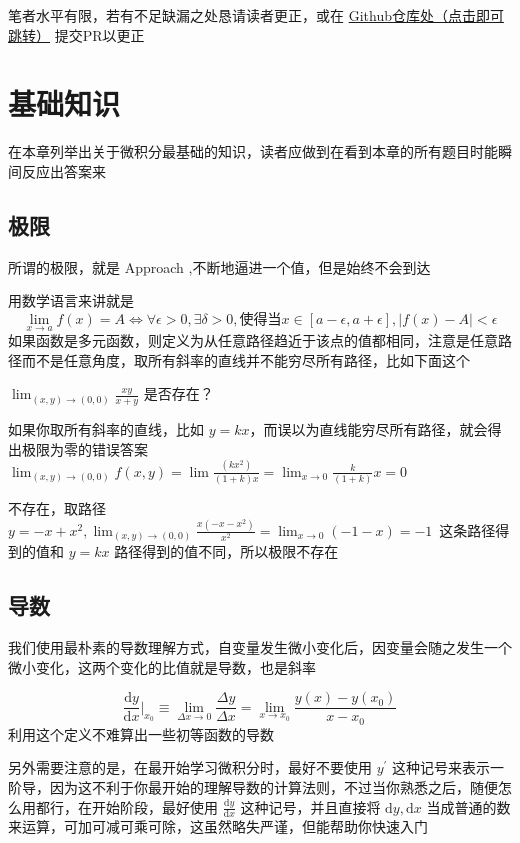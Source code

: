 \documentclass[lang=cn,newtx,10pt,scheme=chinese]{elegantbook}
\begin{document}
笔者水平有限，若有不足缺漏之处恳请读者更正，或在 \href{https://github.com/Monika-shipship/MonikaMathLecture}{Github仓库处（点击即可跳转）} 提交PR以更正
\mainmatter

\chapter{基础知识}
在本章列举出关于微积分最基础的知识，读者应做到在看到本章的所有题目时能瞬间反应出答案来
\section{极限}
所谓的极限，就是 Approach ,不断地逼进一个值，但是始终不会到达

用数学语言来讲就是
\begin{equation}
  \lim_{x \to a} f(x)=A \iff \forall \epsilon>0,\exists \delta>0, \text{使得当}x \in \left[ a-\epsilon,a+\epsilon \right], \left\vert f(x) -A\right\vert <\epsilon
\end{equation}
如果函数是多元函数，则定义为从任意路径趋近于该点的值都相同，注意是任意路径而不是任意角度，取所有斜率的直线并不能穷尽所有路径，比如下面这个
\begin{problem}
    $\lim_{(x,y) \to (0,0)} \frac{xy}{x+y} $ 是否存在？
  \end{problem}
  如果你取所有斜率的直线，比如 $y=kx$，而误以为直线能穷尽所有路径，就会得出极限为零的错误答案 $\lim_{(x,y) \to (0,0)} f(x,y)=\lim \frac{(kx^{2})}{(1+k)x}=\lim_{x \to 0} \frac{k}{(1+k)}x=0$
  \begin{solution}
    不存在，取路径 $y=-x+x^{2},\lim_{(x,y) \to (0,0)} \frac{x(-x-x^{2})}{x^{2}}=\lim_{x \to 0}(-1-x)=-1$\
    这条路径得到的值和 $y=kx$ 路径得到的值不同，所以极限不存在
  \end{solution}
\section{导数}
我们使用最朴素的导数理解方式，自变量发生微小变化后，因变量会随之发生一个微小变化，这两个变化的比值就是导数，也是斜率

\begin{equation}
  \frac{\mathrm{d}y}{\mathrm{d}x} \big|_{x_0}\equiv \lim_{\Delta x \to 0} \frac{\Delta y}{\Delta x}=\lim_{x \to x_0} \frac{y(x)-y(x_0)}{x-x_0}
\end{equation}
利用这个定义不难算出一些初等函数的导数

另外需要注意的是，在最开始学习微积分时，最好不要使用 $y^{\prime }$ 这种记号来表示一阶导，因为这不利于你最开始的理解导数的计算法则，不过当你熟悉之后，随便怎么用都行，在开始阶段，最好使用 $\frac{\mathrm{d}y}{\mathrm{d}x}$ 这种记号，并且直接将 $\mathrm{d}y,\mathrm{d}x$ 当成普通的数来运算，可加可减可乘可除，这虽然略失严谨，但能帮助你快速入门
\end{document}
